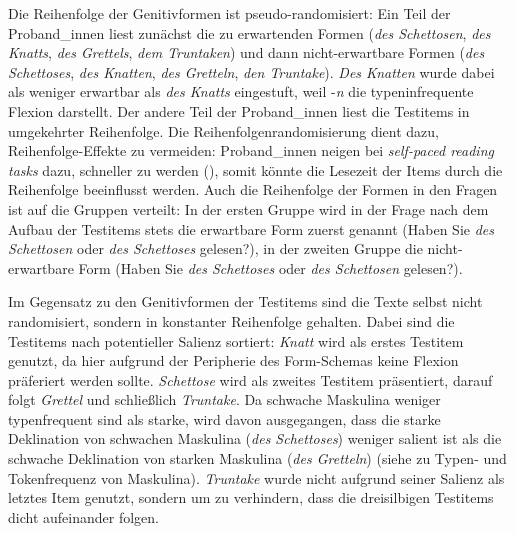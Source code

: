 Die Reihenfolge der Genitivformen ist pseudo-randomisiert: Ein Teil der Proband\_innen liest zunächst die zu erwartenden Formen (\textit{des Schettosen}, \textit{des Knatts}, \textit{des Grettels}, \textit{dem Truntaken}) und dann nicht-erwartbare Formen (\textit{des Schettoses}, \textit{des Knatten}, \textit{des Gretteln}, \textit{den Truntake}). \textit{Des Knatten} wurde dabei als weniger erwartbar als \textit{des Knatts} eingestuft, weil -\textit{n} die typeninfrequente Flexion darstellt. Der andere Teil der Proband\_innen liest die Testitems in umgekehrter Reihenfolge. Die Reihenfolgenrandomisierung dient dazu, Reihenfolge-Effekte zu vermeiden: Proband\_innen neigen bei \textit{self-paced reading tasks} dazu, schneller zu werden (\cite[166--168]{Ackermann.2017}), somit könnte die Lesezeit der Items durch die Reihenfolge beeinflusst werden. Auch die Reihenfolge der Formen in den Fragen ist auf die Gruppen verteilt: In der ersten Gruppe wird in der Frage nach dem Aufbau der Testitems stets die erwartbare Form zuerst genannt (Haben Sie \textit{des Schettosen} oder \textit{des Schettoses} gelesen?), in der zweiten Gruppe die nicht-erwartbare Form (Haben Sie \textit{des Schettoses} oder \textit{des Schettosen} gelesen?).


  

 

Im Gegensatz zu den Genitivformen der Testitems sind die Texte selbst nicht randomisiert, sondern in konstanter Reihenfolge gehalten. Dabei sind die Testitems nach potentieller Sa\-lienz sortiert: \textit{Knatt} wird als erstes Testitem genutzt, da hier aufgrund der Peripherie des Form-Schemas keine Flexion präferiert werden sollte. \textit{Schettose} wird als zweites Testitem präsentiert, darauf folgt \textit{Grettel} und schließlich \textit{Truntake}. Da schwache Maskulina weniger typenfrequent sind als starke, wird davon ausgegangen, dass die starke Deklination von schwachen Maskulina (\textit{des Schettoses}) weniger salient ist als die schwache Deklination von starken Maskulina (\textit{des Gretteln}) (siehe  zu Typen- und Tokenfrequenz von Maskulina). \textit{Truntake} wurde nicht aufgrund seiner Salienz als letztes Item genutzt, sondern um zu verhindern, dass die dreisilbigen Testitems dicht aufeinander folgen.  


